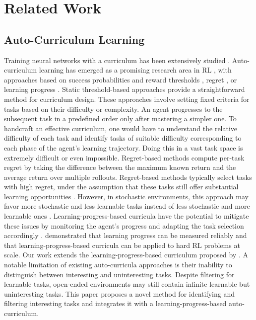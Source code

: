 \documentclass{article} %
\begin{document}
\section{Related Work}
\label{sec:related}

\subsection{Auto-Curriculum Learning}
Training neural networks with a curriculum has been extensively studied \citep{bengio2009curriculum}. Auto-curriculum learning has emerged as a promising research area in RL \citep{ingmar, matiisen2017, portelas2019teacher, graves2017automated, kovavc2022grimgep, baranes2013active, lehman2011novelty, eysenbach2018diversity, poet, wang2020enhanced, akkaya2019solving, florensa2017, zhang2020, amigo, plappert2021, dennis2020, gur2021, jiang2021prioritized, dharna2022}, with approaches based on success probabilities and reward thresholds \citep{poet, wang2020enhanced, akkaya2019solving, amigo, tan2023perceptive}, regret \citep{dennis2020, gur2021, jiang2021prioritized}, or learning progress \citep{ingmar, matiisen2017, portelas2019teacher, graves2017automated, kovavc2022grimgep, baranes2013active}. Static threshold-based approaches provide a straightforward method for curriculum design. These approaches involve setting fixed criteria for tasks based on their difficulty or complexity. An agent progresses to the subsequent task in a predefined order only after mastering a simpler one. To handcraft an effective curriculum, one would have to understand the relative difficulty of each task and identify tasks of suitable difficulty corresponding to each phase of the agent's learning trajectory. Doing this in a vast task space is extremely difficult or even impossible. Regret-based methods compute per-task regret by taking the difference between the maximum known return and the average return over multiple rollouts. Regret-based methods typically select tasks with high regret, under the assumption that these tasks still offer substantial learning opportunities \citep{dennis2020, gur2021, jiang2021prioritized}. However, in stochastic environments, this approach may favor more stochastic and less learnable tasks instead of less stochastic and more learnable ones \citep{ingmar}. Learning-progress-based curricula have the potential to mitigate these issues by monitoring the agent's progress and adapting the task selection accordingly \citep{ingmar, matiisen2017, portelas2019teacher, graves2017automated, kovavc2022grimgep, baranes2013active}. \citet{ingmar} demonstrated that learning progress can be measured reliably and that learning-progress-based curricula can be applied to hard RL problems at scale. Our work extends the learning-progress-based curriculum proposed by \citet{ingmar}. A notable limitation of existing auto-curricula approaches is their inability to distinguish between interesting and uninteresting tasks. Despite filtering for learnable tasks, open-ended environments may still contain infinite learnable but uninteresting tasks. This paper proposes a novel method for identifying and filtering interesting tasks and integrates it with a learning-progress-based auto-curriculum. 
\end{document}
